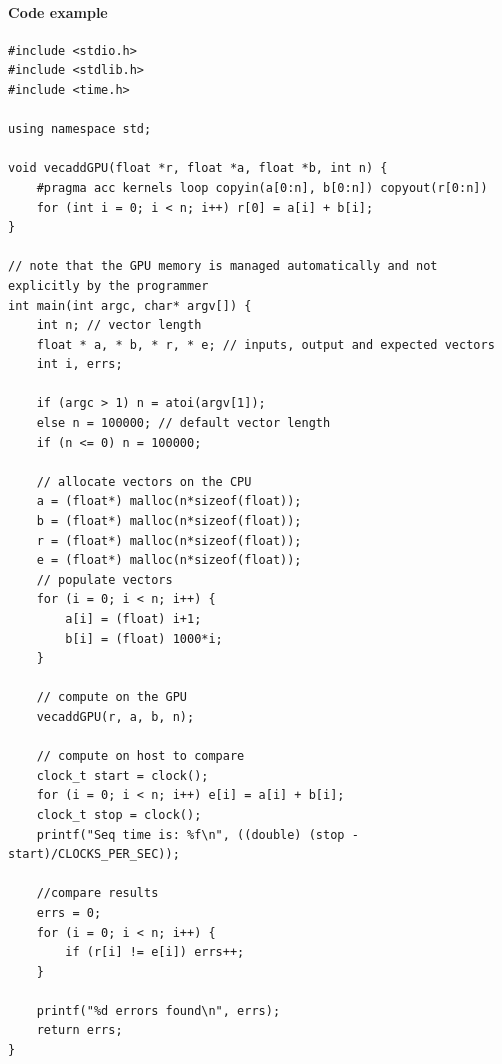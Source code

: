 \documentclass[10pt]{report}
\begin{document}
\paragraph{Code example}

\begin{lstlisting}[style=myC]
#include <stdio.h>
#include <stdlib.h>
#include <time.h>

using namespace std;

void vecaddGPU(float *r, float *a, float *b, int n) {
	#pragma acc kernels loop copyin(a[0:n], b[0:n]) copyout(r[0:n])
	for (int i = 0; i < n; i++) r[0] = a[i] + b[i];
}

// note that the GPU memory is managed automatically and not explicitly by the programmer
int main(int argc, char* argv[]) {
	int n; // vector length
	float * a, * b, * r, * e; // inputs, output and expected vectors
	int i, errs;

	if (argc > 1) n = atoi(argv[1]);
	else n = 100000; // default vector length
	if (n <= 0) n = 100000;

	// allocate vectors on the CPU
	a = (float*) malloc(n*sizeof(float));
	b = (float*) malloc(n*sizeof(float));
	r = (float*) malloc(n*sizeof(float));
	e = (float*) malloc(n*sizeof(float));
	// populate vectors
	for (i = 0; i < n; i++) {
		a[i] = (float) i+1;
		b[i] = (float) 1000*i;
	}

	// compute on the GPU
	vecaddGPU(r, a, b, n);

	// compute on host to compare
	clock_t start = clock();
	for (i = 0; i < n; i++) e[i] = a[i] + b[i];
	clock_t stop = clock();
	printf("Seq time is: %f\n", ((double) (stop - start)/CLOCKS_PER_SEC));

	//compare results
	errs = 0;
	for (i = 0; i < n; i++) {
		if (r[i] != e[i]) errs++;
	}

	printf("%d errors found\n", errs);
	return errs;
}
\end{lstlisting}
\end{document}
